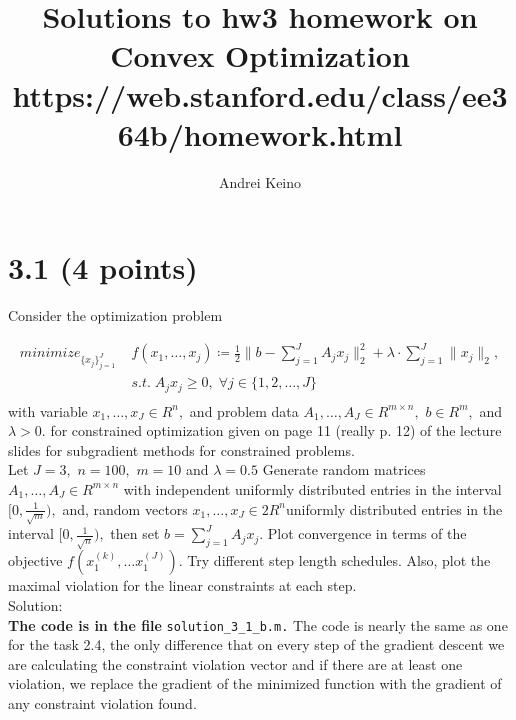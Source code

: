 \documentclass{article}
\begin{document}
\title{Solutions to hw3 homework on Convex Optimization https://web.stanford.edu/class/ee364b/homework.html}
\author{Andrei Keino}
\maketitle

\section*{3.1 (4 points)} 
Consider the optimization problem

\begin{align*}
	minimize_{\{x_j\}_{j = 1}^J} \; &  
	f(x_1, \dots, x_j) \coloneqq
	\frac{1}{2} \lVert b - \sum_{j = 1}^{J} 
	A_j x_j \rVert_2^2 
	+ \lambda \cdot   \sum_{j = 1}^{J} 
	\lVert x_j \rVert_2,
	\\
	& s.t. \; A_j x_j \geq 0, \; \forall j 
	\in \{1, 2, \dots, J\} \\
\end{align*}
with variable $x_1, \dots, x_J \in R^n, $ and 
problem data $A_1, \dots, A_J \in R^{m \times n}, $ 
$b \in R^m,$ and $\lambda > 0.$ for constrained optimization given on page 11 (really p. 12) of the lecture slides for subgradient methods for constrained problems. \\


Let $J = 3,$ $n = 100,$ $m = 10$ and $\lambda = 0.5$ Generate random matrices
$A_1, \dots , A_J \in R^{m\times n}$ with independent uniformly distributed entries in the interval 
$[0, \frac{1}{\sqrt{m}}),$ and, random vectors $x_1, \dots,  x_J \in 2 R^n$uniformly distributed entries in the interval 
$[0, \frac{1}{\sqrt{n}}),$ then set 
$b = \sum_{j = 1}^{J} A_j x_j.$
Plot convergence in terms of the
objective $f(x_1^{(k)}, \dots x_1^{(J)}).$ 
Try different step length schedules. Also, plot the maximal violation for the linear constraints at each step.\\

Solution: \\
\textbf{The code is in the file} \verb |solution_3_1_b.m.| The code 
is nearly the same as one for the task 2.4, the only difference that on every step of the gradient descent we are calculating the constraint violation vector and if 
there are at least one violation, we replace the gradient of the minimized function with the gradient of any constraint violation found.
\end{document}

